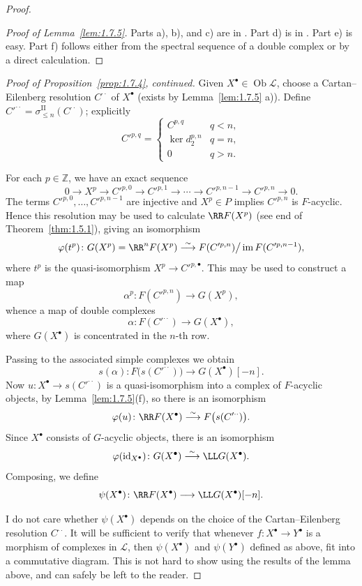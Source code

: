 \begin{proof}
\begin{proof}[Proof of Lemma~\ref{lem:1.7.5}]
Parts a), b), and c) are in \cite[\nopp Ch.~XVII, Prop.~1.2]{M}. Part d) is in \cite[\nopp Ch.~IV, \S4]{M}. Part e) is easy. Part f) follows either from the spectral sequence of a double complex \cite[\nopp $0_{\mathrm{III}}$, 11.3.3(ii)]{EGA} or by a direct calculation.
\end{proof}

\textit{Proof of Proposition~\ref{prop:1.7.4}, continued.}
Given $X^\bullet\in\operatorname{Ob}\mathcal{L}$, choose a Cartan--Eilenberg resolution $C^{\cdot\cdot}$ of $X^\bullet$ (exists by Lemma~\ref{lem:1.7.5} a)). Define $C'^{\cdot\cdot} = \sigma^{\mathrm{II}}_{\le n}(C^{\cdot\cdot})$; explicitly
\[
C'^{p,q}=
\begin{cases}
C^{p,q} & q<n,\\
\ker d_2^{p,n} & q=n,\\
0 & q>n.
\end{cases}
\]

For each $p\in\mathbb{Z}$, we have an exact sequence
\[
0\to X^p\to C'^{p,0}\to C'^{p,1}\to\cdots\to C'^{p,n-1}\to C'^{p,n}\to 0.
\]
The terms $C'^{p,0},\dots,C'^{p,n-1}$ are injective and $X^p\in P$ implies $C'^{p,n}$ is $F$-acyclic. Hence this resolution may be used to calculate $\RR F(X^p)$ (see end of Theorem~\ref{thm:1.5.1}), giving an isomorphism
\[
\varphi(t^p)\colon G(X^p)=\RR^nF(X^p) \stackrel{\sim}{\longrightarrow} F(C'^{p,n})\big/\operatorname{im}F(C'^{p,n-1}),
\]
where $t^p$ is the quasi-isomorphism $X^p\to C'^{p,\bullet}$. This may be used to construct a map
\[
\alpha^p\colon F(C'^{p,n})\to G(X^p),
\]
whence a map of double complexes
\[
\alpha\colon F(C'^{\cdot\cdot})\to G(X^\bullet),
\]
where $G(X^\bullet)$ is concentrated in the $n$-th row.

Passing to the associated simple complexes we obtain
\[
s(\alpha)\colon F\big(s(C'^{\cdot\cdot})\big)\to G(X^\bullet)[-n].
\]
Now $u\colon X^\bullet\to s(C'^{\cdot\cdot})$ is a quasi-isomorphism into a complex of $F$-acyclic objects, by Lemma~\ref{lem:1.7.5}(f), so there is an isomorphism
\[
\varphi(u)\colon \RR F(X^\bullet) \stackrel{\sim}{\longrightarrow} F\big(s(C'^{\cdot\cdot})\big).
\]
Since $X^\bullet$ consists of $G$-acyclic objects, there is an isomorphism
\[
\varphi(\operatorname{id}_{X^\bullet})\colon G(X^\bullet) \stackrel{\sim}{\longrightarrow} \LL G(X^\bullet).
\]
Composing, we define
\[
\psi(X^\bullet)\colon \RR F(X^\bullet) \longrightarrow \LL G(X^\bullet)[-n].
\]

I do not care whether  $\psi(X^\bullet)$ depends on the choice of the Cartan--Eilenberg resolution $C^{\cdot\cdot}$. It will be sufficient to verify that whenever $f\colon X^\bullet\to Y^\bullet$ is a morphism of complexes in $\mathcal{L}$, then $\psi(X^\bullet)$ and $\psi(Y^\bullet)$ defined as above, fit into a commutative diagram. This is not hard to show using the results of the lemma above, and can safely be left to the reader.


\end{proof}

